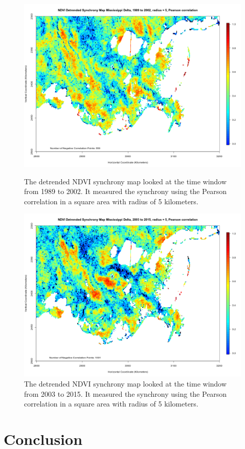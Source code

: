 \documentclass[11pt,reqno, twoside]{amsart}
\theoremstyle{plain}  %
\theoremstyle{definition}
\numberwithin{figure}{section}
\numberwithin{equation}{section}
\begin{document}
\begin{figure}[ht]
\begin{minipage}[b]{0.5\linewidth}
    \includegraphics[width=1\linewidth]{images/NDVIDetrendedSynchronyMap_MississippiDelta_1989to2002_r5_Pearson.png} 
    \caption{The detrended NDVI synchrony map looked at the time window from 1989 to 2002. It measured the synchrony using the Pearson correlation in a square area with radius of 5 kilometers.} 
    \vspace{4ex}
  \end{minipage}%
  \begin{minipage}[b]{0.5\linewidth}
    \centering
    \includegraphics[width=1\linewidth]{images/NDVIDetrendedSynchronyMap_MississippiDelta_2003to2015_r5_Pearson.png} 
    \caption{The detrended NDVI synchrony map looked at the time window from 2003 to 2015. It measured the synchrony using the Pearson correlation in a square area with radius of 5 kilometers.} 
    \vspace{4ex}
  \end{minipage} 
\end{figure}
\section{Conclusion}
\end{document}
